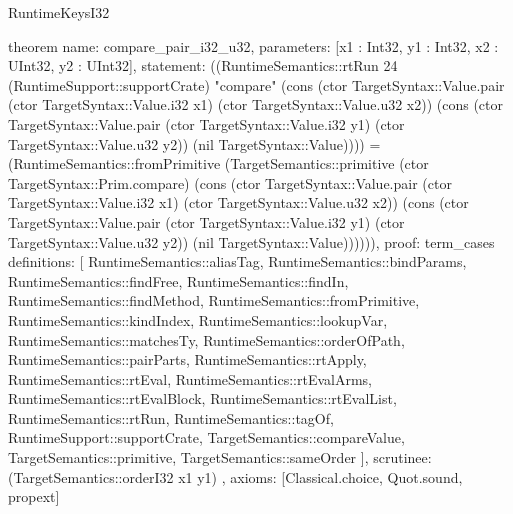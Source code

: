 \begin{lexlean}{RuntimeKeysI32}
\begin{semanticmodule}
theorem{
  name: compare_pair_i32_u32,
  parameters: [x1 : Int32, y1 : Int32, x2 : UInt32, y2 : UInt32],
  statement: ((RuntimeSemantics::rtRun 24 (RuntimeSupport::supportCrate) "compare" (cons (ctor TargetSyntax::Value.pair (ctor TargetSyntax::Value.i32 x1) (ctor TargetSyntax::Value.u32 x2)) (cons (ctor TargetSyntax::Value.pair (ctor TargetSyntax::Value.i32 y1) (ctor TargetSyntax::Value.u32 y2)) (nil TargetSyntax::Value)))) = (RuntimeSemantics::fromPrimitive (TargetSemantics::primitive (ctor TargetSyntax::Prim.compare) (cons (ctor TargetSyntax::Value.pair (ctor TargetSyntax::Value.i32 x1) (ctor TargetSyntax::Value.u32 x2)) (cons (ctor TargetSyntax::Value.pair (ctor TargetSyntax::Value.i32 y1) (ctor TargetSyntax::Value.u32 y2)) (nil TargetSyntax::Value)))))),
  proof: term_cases{
    definitions: [
      RuntimeSemantics::aliasTag,
      RuntimeSemantics::bindParams,
      RuntimeSemantics::findFree,
      RuntimeSemantics::findIn,
      RuntimeSemantics::findMethod,
      RuntimeSemantics::fromPrimitive,
      RuntimeSemantics::kindIndex,
      RuntimeSemantics::lookupVar,
      RuntimeSemantics::matchesTy,
      RuntimeSemantics::orderOfPath,
      RuntimeSemantics::pairParts,
      RuntimeSemantics::rtApply,
      RuntimeSemantics::rtEval,
      RuntimeSemantics::rtEvalArms,
      RuntimeSemantics::rtEvalBlock,
      RuntimeSemantics::rtEvalList,
      RuntimeSemantics::rtRun,
      RuntimeSemantics::tagOf,
      RuntimeSupport::supportCrate,
      TargetSemantics::compareValue,
      TargetSemantics::primitive,
      TargetSemantics::sameOrder
    ],
    scrutinee: (TargetSemantics::orderI32 x1 y1)
  },
  axioms: [Classical.choice, Quot.sound, propext]
}


\end{semanticmodule}
\end{lexlean}
